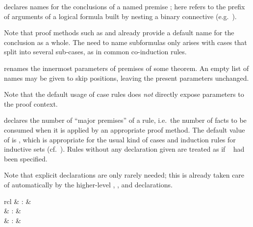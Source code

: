 \begin{isabellebody}
\begin{isamarkuptext}
\begin{descr}
  \item [\mbox{\isa{case{\isacharunderscore}conclusion}}~\isa{c\ d\isactrlsub {\isadigit{1}}\ {\isasymdots}\ d\isactrlsub k}] declares names for the conclusions of a named premise
  ; here  refers to the
  prefix of arguments of a logical formula built by nesting a binary
  connective (e.g.\ \isa{{\isasymor}}).
  
  Note that proof methods such as \mbox{} and \mbox{} already provide a default name for the conclusion as a
  whole.  The need to name subformulas only arises with cases that
  split into several sub-cases, as in common co-induction rules.

  \item [\mbox{\isa{params}}~\isa{p\isactrlsub {\isadigit{1}}\ {\isasymdots}\ p\isactrlsub m\ {\isasymAND}\ {\isasymdots}\ q\isactrlsub {\isadigit{1}}\ {\isasymdots}\ q\isactrlsub n}] renames the innermost parameters of
  premises  of some theorem.  An empty list of names
  may be given to skip positions, leaving the present parameters
  unchanged.
  
  Note that the default usage of case rules does \emph{not} directly
  expose parameters to the proof context.
  
  \item [\mbox{\isa{consumes}}~\isa{n}] declares the number of
  ``major premises'' of a rule, i.e.\ the number of facts to be
  consumed when it is applied by an appropriate proof method.  The
  default value of \mbox{} is , which is
  appropriate for the usual kind of cases and induction rules for
  inductive sets (cf.\ ).  Rules without any
  \mbox{} declaration given are treated as if
  \mbox{}~ had been specified.
  
  Note that explicit \mbox{} declarations are only
  rarely needed; this is already taken care of automatically by the
  higher-level \mbox{}, \mbox{}, and
  \mbox{} declarations.

  \end{descr}%
\end{isamarkuptext}%
\isamarkuptrue%
%
\isamarkuptrue%
%
\begin{isamarkuptext}%
\begin{matharray}{rcl}
    \mbox{} & : & \isarmeth \\
    \mbox{} & : & \isarmeth \\
    \mbox{} & : & \isarmeth \\
  \end{matharray}


\end{isamarkuptext}
\end{isabellebody}
